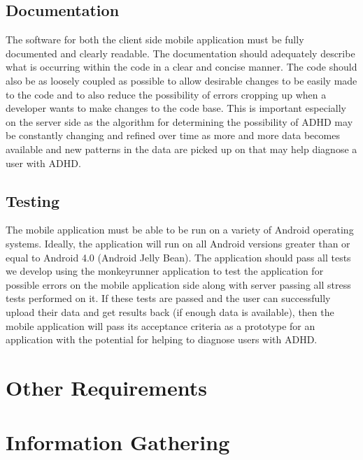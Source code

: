 \documentclass[a4wide]{article}
\begin{document}
\begin{itemize}
\subsection{Documentation} 
The software for both the client side mobile application must be fully documented and clearly readable. The documentation should adequately describe what is occurring within the code in a clear and concise manner. The code should also be as loosely coupled as possible to allow desirable changes to be easily made to the code and to also reduce the possibility of errors cropping up when a developer wants to make changes to the code base. This is important especially on the server side as the algorithm for determining the possibility of ADHD may be constantly changing and refined over time as more and more data becomes available and new patterns in the data are picked up on that may help diagnose a user with ADHD.
\subsection{Testing}
The mobile application must be able to be run on a variety of Android operating systems. Ideally, the application will run on all Android versions greater than or equal to Android 4.0 (Android Jelly Bean). The application should pass all tests we develop using the monkeyrunner application to test the application for possible errors on the mobile application side along with server passing all stress tests performed on it. If these tests are passed and the user can successfully upload their data and get results back (if enough data is available), then the mobile application will pass its acceptance criteria as a prototype for an application with the potential for helping to diagnose users with ADHD.




\section{Other Requirements}
\newpage
\appendix
\appendixpage

\section{Information Gathering}


\end{itemize}
\end{document}
